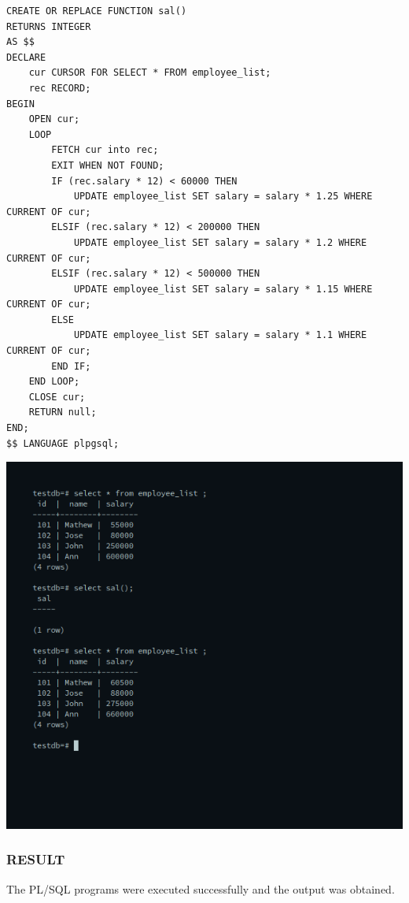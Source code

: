 \documentclass[10pt,a4paper,titlepage]{report}
\begin{document}
{\begin{enumerate}
\begin{verbatim}
CREATE OR REPLACE FUNCTION sal()
RETURNS INTEGER
AS $$
DECLARE
	cur CURSOR FOR SELECT * FROM employee_list;
	rec RECORD;
BEGIN
	OPEN cur;
	LOOP
		FETCH cur into rec;
		EXIT WHEN NOT FOUND;
		IF (rec.salary * 12) < 60000 THEN
			UPDATE employee_list SET salary = salary * 1.25 WHERE CURRENT OF cur;
		ELSIF (rec.salary * 12) < 200000 THEN
			UPDATE employee_list SET salary = salary * 1.2 WHERE CURRENT OF cur;
		ELSIF (rec.salary * 12) < 500000 THEN
			UPDATE employee_list SET salary = salary * 1.15 WHERE CURRENT OF cur;
		ELSE
			UPDATE employee_list SET salary = salary * 1.1 WHERE CURRENT OF cur;
		END IF;
	END LOOP;
	CLOSE cur;
	RETURN null;
END;
$$ LANGUAGE plpgsql;
	\end{verbatim}
	\includegraphics[width=\linewidth]{../Images/Cursors/4.png}

\end{enumerate}

\subsubsection{RESULT}
The PL/SQL programs were executed successfully and the output was obtained.

}
\end{document}
